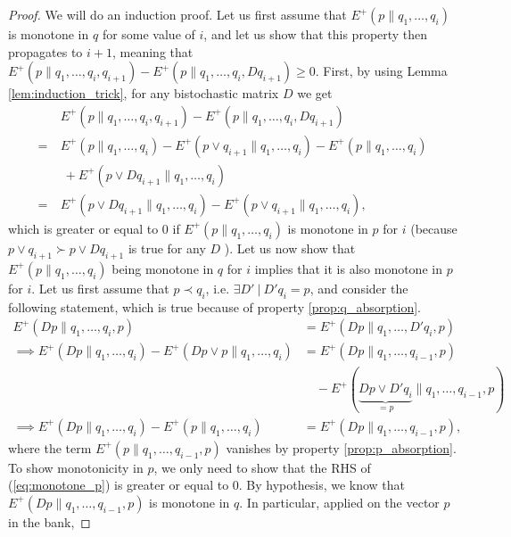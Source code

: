 \begin{proof}
    We will do an induction proof. Let us first assume that $E^+(p \parallel q_1, \dots, q_i)$ is monotone in $q$ for some value of $i$, and let us show that this property then propagates to $i+1$, meaning that $E^+(p \parallel q_1, \dots, q_i, q_{i+1}) - E^+(p \parallel q_1, \dots, q_i, Dq_{i+1}) \geq 0$. First, by using Lemma \ref{lem:induction_trick}, for any bistochastic matrix $D$ we get
    \begin{align}
        &E^+(p \parallel q_1, \dots, q_i, q_{i+1}) - E^+(p \parallel q_1, \dots, q_i, Dq_{i+1})\nonumber \\
        = \: &E^+(p \parallel q_1, \dots, q_i) - E^+(p \vee q_{i+1} \parallel q_1, \dots, q_i) - E^+(p \parallel q_1, \dots, q_i)\nonumber\\
        &\: +  E^+(p \vee Dq_{i+1} \parallel q_1, \dots, q_i)\\
        = \: &E^+(p \vee Dq_{i+1} \parallel q_1, \dots, q_i) - E^+(p \vee q_{i+1} \parallel q_1, \dots, q_i),
    \end{align}
    which is greater or equal to 0 if $E^+(p \parallel q_1, \dots, q_i)$ is monotone in $p$ for $i$ (because $p \vee q_{i+1} \succ p \vee Dq_{i+1}$ is true for any $D$ \cite[p. 35]{davey_introduction_2002}). Let us now show that $E^+(p \parallel q_1, \dots, q_i)$ being monotone in $q$ for $i$ implies that it is also monotone in $p$ for $i$. Let us first assume that $p \prec q_i$, i.e. $\exists D' \: | \: D' q_i = p$, and consider the following statement, which is true because of property \ref{prop:q_absorption}.
    \begin{align}
        E^+(Dp \parallel q_1, \dots, q_i, p) &= E^+(Dp \parallel q_1, \dots, D'q_i, p) \\
        \implies E^+(Dp \parallel q_1, \dots, q_i) - E^+(Dp \vee p \parallel q_1, \dots, q_i) &= E^+(Dp \parallel q_1, \dots, q_{i-1}, p)\nonumber\\
        &\quad - E^+(\underbrace{Dp \vee D'q_i}_{=p} \parallel q_1, \dots, q_{i-1}, p)\\
        \implies E^+(Dp \parallel q_1, \dots, q_i) - E^+(p \parallel q_1, \dots, q_i) &= E^+(Dp \parallel q_1, \dots, q_{i-1}, p), \label{eq:monotone_p}
    \end{align}
    where the term $E^+(p \parallel q_1, \dots, q_{i-1}, p)$ vanishes by property \ref{prop:p_absorption}. To show monotonicity in $p$, we only need to show that the RHS of (\ref{eq:monotone_p}) is greater or equal to 0. By hypothesis, we know that $E^+(Dp \parallel q_1, \dots, q_{i-1}, p)$ is monotone in $q$. In particular, applied on the vector $p$ in the bank,

\end{proof}

